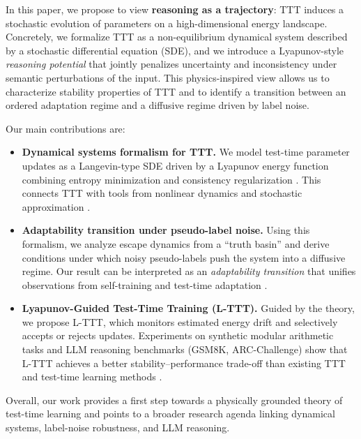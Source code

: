 \documentclass{article}
\theoremstyle{plain}
\theoremstyle{definition}
\theoremstyle{remark}
\begin{document}
In this paper, we propose to view \textbf{reasoning as a trajectory}: TTT induces a stochastic evolution of parameters on a high-dimensional energy landscape. Concretely, we formalize TTT as a non-equilibrium dynamical system described by a stochastic differential equation (SDE), and we introduce a Lyapunov-style \emph{reasoning potential} that jointly penalizes uncertainty and inconsistency under semantic perturbations of the input. This physics-inspired view allows us to characterize stability properties of TTT and to identify a transition between an ordered adaptation regime and a diffusive regime driven by label noise.

Our main contributions are:
\begin{itemize}
    \item \textbf{Dynamical systems formalism for TTT.} We model test-time parameter updates as a Langevin-type SDE driven by a Lyapunov energy function combining entropy minimization and consistency regularization \cite{grandvalet2005entropy,sohn2020fixmatch,zhai2019s4l}. This connects TTT with tools from nonlinear dynamics and stochastic approximation \cite{strogatz2018,khalil2002lyapunov,welling2011bayesian,borkar2000ode}.
    \item \textbf{Adaptability transition under pseudo-label noise.} Using this formalism, we analyze escape dynamics from a ``truth basin'' and derive conditions under which noisy pseudo-labels push the system into a diffusive regime. Our result can be interpreted as an \emph{adaptability transition} that unifies observations from self-training and test-time adaptation \cite{chen2024understanding,kumar2024consistency,zhang2024surveytta}.
    \item \textbf{Lyapunov-Guided Test-Time Training (L-TTT).} Guided by the theory, we propose L-TTT, which monitors estimated energy drift and selectively accepts or rejects updates. Experiments on synthetic modular arithmetic tasks and LLM reasoning benchmarks (GSM8K, ARC-Challenge) show that L-TTT achieves a better stability–performance trade-off than existing TTT and test-time learning methods \cite{sun2020ttt,wang2021tent,sun2023learning,templora2024,tlm2025,inplacettt2025}.
\end{itemize}

Overall, our work provides a first step towards a physically grounded theory of test-time learning and points to a broader research agenda linking dynamical systems, label-noise robustness, and LLM reasoning.


\end{document}

